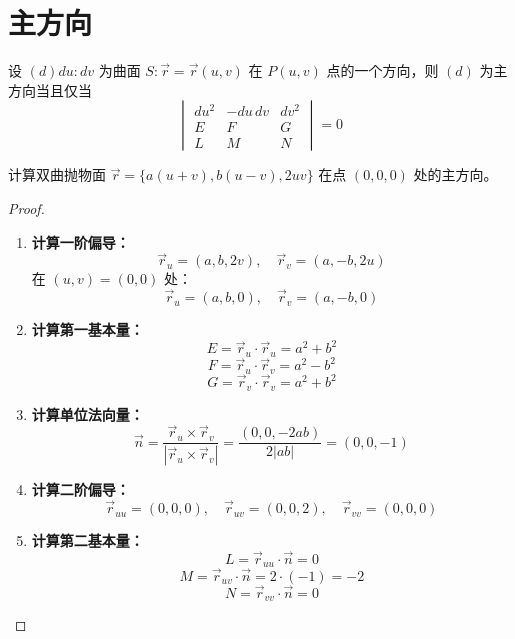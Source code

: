\documentclass[lang=cn,10pt,thmcnt=section]{elegantbook}
\begin{document}
\section{主方向}
\begin{definition}
	设 $(d) du:dv$ 为曲面 $S: \vec{r} = \vec{r}(u,v)$ 在 $P(u,v)$ 点的一个方向，则 $(d)$ 为主方向当且仅当
	\[
	\begin{vmatrix}
	du^2 & -du \, dv & dv^2 \\
	E & F & G \\
	L & M & N
	\end{vmatrix}
	= 0 
	\]
\end{definition}
\begin{example}
	计算双曲抛物面 $\vec{r} = \{a(u+v), b(u-v), 2uv\}$ 在点 $(0,0,0)$ 处的主方向。
\end{example}
\begin{proof}
    \begin{enumerate}
        \item \textbf{计算一阶偏导：}
        \[
            \vec{r}_u = (a, b, 2v), \quad \vec{r}_v = (a, -b, 2u)
        \]
        在 $(u,v) = (0,0)$ 处：
        \[
            \vec{r}_u = (a, b, 0), \quad \vec{r}_v = (a, -b, 0)
        \]
        
        \item \textbf{计算第一基本量：}
        \[
            E = \vec{r}_u \cdot \vec{r}_u = a^2 + b^2
        \]
        \[
            F = \vec{r}_u \cdot \vec{r}_v = a^2 - b^2
        \]
        \[
            G = \vec{r}_v \cdot \vec{r}_v = a^2 + b^2
        \]
        
        \item \textbf{计算单位法向量：}
        \[
            \vec{n} = \frac{\vec{r}_u \times \vec{r}_v}{|\vec{r}_u \times \vec{r}_v|} = \frac{(0, 0, -2ab)}{2|ab|} = (0, 0, -1)
        \]
        
        \item \textbf{计算二阶偏导：}
        \[
            \vec{r}_{uu} = (0, 0, 0), \quad \vec{r}_{uv} = (0, 0, 2), \quad \vec{r}_{vv} = (0, 0, 0)
        \]
        
        \item \textbf{计算第二基本量：}
        \[
            L = \vec{r}_{uu} \cdot \vec{n} = 0
        \]
        \[
            M = \vec{r}_{uv} \cdot \vec{n} = 2 \cdot (-1) = -2
        \]
        \[
            N = \vec{r}_{vv} \cdot \vec{n} = 0
        \]
        

\end{enumerate}
\end{proof}
\end{document}
